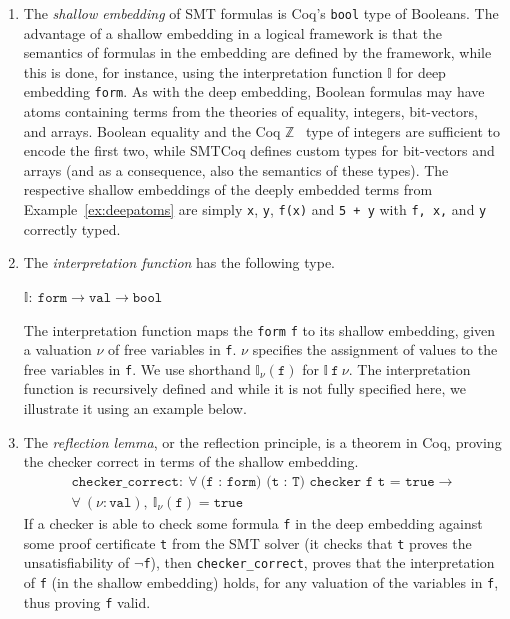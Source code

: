 \documentclass[11pt]{article}
\begin{document}
	\begin{enumerate}
		\item The \emph{shallow 
		embedding} of SMT formulas
		is Coq's \texttt{bool} 
		type of Booleans. The 
		advantage of a shallow 
		embedding in a logical 
		framework is that  the 
		semantics of formulas in 
		the embedding are 
		defined by the framework, 
		while 
		this is done, for 
		instance, using the 
		interpretation function
		$\mathbb{I}$ for deep 
		embedding \texttt{form}.
		As with the deep embedding, 
		Boolean	formulas may have 
		atoms containing terms from 
		the theories of equality, 
		integers, bit-vectors,
		and arrays. Boolean equality 
		and	the Coq 
		$\mathbb{Z}$~\cite{CoqZ} type 
		of integers are sufficient 
		to encode the first two, 
		while SMTCoq defines custom 
		types for bit-vectors and 
		arrays (and as a consequence,
		also the semantics of these
		types). The respective 
		shallow embeddings of
		the deeply embedded terms from 
		Example~\ref{ex:deepatoms} are simply
		\texttt{x}, \texttt{y}, \texttt{f(x)} 
		and \texttt{5 + y} 
		with \texttt{f, x,} and \texttt{y}
		correctly typed. 
	
		\item The \emph{interpretation 
		function} has the following type.
		\begin{center}
			$\mathbb{I} :\ \texttt{form} \to 
			\texttt{val} \to \texttt{bool}$
		\end{center}
		The interpretation function maps 
		the \texttt{form} \texttt{f} to 
		its shallow embedding, given 
		a valuation $\nu$ of free 
		variables in \texttt{f}. 
		$\nu$ specifies the assignment 
		of values to the free variables in 
		\texttt{f}. We use shorthand 
		$\mathbb{I}_{\nu}
		(\texttt{f})$ for $\mathbb{I}\ 
		\texttt{f}\ \nu$. The interpretation
		function is recursively defined
		and while it is not fully 
		specified here, we 
		illustrate it using an 
		example below.
	
		\item The \emph{reflection 
		lemma}, or the 
		reflection principle, is a 
		theorem in Coq, proving the 
		checker correct in terms of 
		the shallow embedding.
		\begin{align*}
			\texttt{checker\_correct} :\ 
			\forall\ \texttt{(f : form)
			(t : T) checker f t = true} 
			\to \\
			\forall\ (\nu : \texttt{val}),\ 
			\mathbb{I}_{\nu}(\texttt{f}) = 
			\texttt{true}
		\end{align*}
		If a checker is able to check 
		some formula \texttt{f} in 
		the deep embedding against
		some proof certificate 
		\texttt{t} from 
		the SMT solver (it checks that 
		\texttt{t} proves the 
		unsatisfiability
		of \texttt{$\neg$f}), then 
		\texttt{checker\_correct},
		proves that the 
		interpretation of \texttt{f}
		(in the shallow embedding)
		holds, for any valuation of 
		the variables in \texttt{f}, 
		thus proving \texttt{f} valid. 
	

\end{enumerate}
\end{document}
